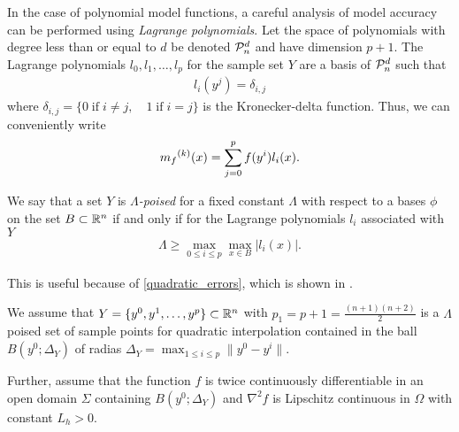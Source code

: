 In the case of polynomial model functions, a careful analysis of model accuracy can be performed using \emph{Lagrange polynomials}.
Let the space of polynomials with degree less than or equal to $d$ be denoted $\mathcal{P}^d_n$ and have dimension $p+1$.
The Lagrange polynomials $l_0, l_1, \ldots, l_p$ for the sample set $Y$ are a basis of $\mathcal{P}^d_n$ such that
\begin{align}
l_i(y^j) = \delta_{i,j}
\end{align}
where $\delta_{i,j} = \{0 \;\text{if}\; i\ne j,\quad 1 \;\text{if} \; i = j \}$ is the Kronecker-delta function.
Thus, we can conveniently write
\begin{align}
\label{reg}
{{m}_f}^{(k)}(x) = \sum^p_{j=0}f(y^i)l_i(x).
\end{align}

We say that a set $Y$ is \emph{$\Lambda$-poised} for a fixed constant $\Lambda$ with respect to a bases $\phi$ on the set 
$B \subset\mathbb R^n$ if and only if for the Lagrange polynomials $l_i$ associated with $Y$
\begin{align}
\Lambda \ge \max_{0\le i\le p}\max_{x\in B}|l_i(x)|.
\end{align}


This is useful because of \cref{quadratic_errors}, which is shown in \cite{DUMMY:intro_book}.

\begin{assumption}
\label{introduction_3_1}
We assume that $Y = \{y^0, y^1, \ldots, y^p\} \subset \mathbb R^n$ with $p_1 = p+1= \frac{(n+1)(n+2)}{2}$ is a $\Lambda$ poised set of sample points for quadratic interpolation contained in the ball $B(y^0; \Delta_Y)$ of radias $\Delta_Y = \max_{1\le i \le p} \|y^0 - y^i\|$.

Further, assume that the function $f$ is twice continuously differentiable in an open domain $\Sigma$ containing $B(y^0; \Delta_Y)$ and $\nabla^2 f$ is Lipschitz continuous in $\Omega$ with constant $L_h > 0$.
\end{assumption}


